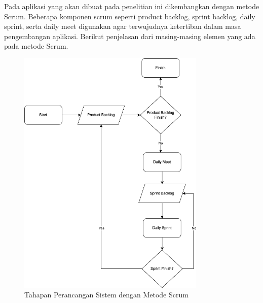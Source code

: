 Pada aplikasi yang akan dibuat pada penelitian ini dikembangkan dengan metode Scrum. Beberapa komponen scrum seperti product backlog, sprint backlog, daily sprint, serta daily meet digunakan agar terwujudnya ketertiban dalam masa pengembangan aplikasi. Berikut penjelasan dari masing-masing elemen yang ada pada metode Scrum.

\begin{figure}[H]
	\centering
	\includegraphics[width=0.8\textwidth]{gambar/scrum.png}
	\caption{Tahapan Perancangan Sistem dengan Metode Scrum}
\end{figure}

